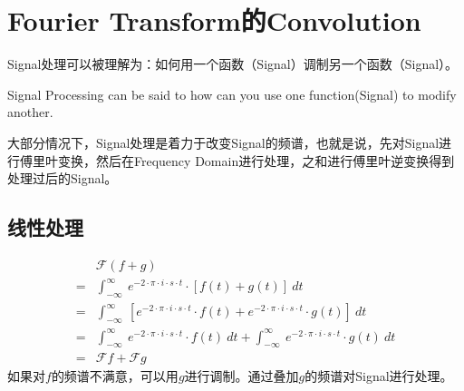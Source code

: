 \section{Fourier Transform的Convolution}
Signal处理可以被理解为：如何用一个函数（Signal）调制另一个函数（Signal）。

Signal Processing can be said to how can you use one function(Signal) to modify another.

大部分情况下，Signal处理是着力于改变Signal的频谱，也就是说，先对Signal进行傅里叶变换，然后在Frequency Domain进行处理，之和进行傅里叶逆变换得到处理过后的Signal。
\subsection{线性处理}
\begin{align*}
	  & \mathcal{F}(f+g)                                                                                                                                        \\
	= & \int_{-\infty}^{\infty}\ e^{-2\cdot \pi\cdot i\cdot s\cdot t}\cdot [f(t)+g(t)]\ dt                                                                      \\
	= & \int_{-\infty}^{\infty}\ [e^{-2\cdot \pi\cdot i\cdot s\cdot t}\cdot f(t)+e^{-2\cdot \pi\cdot i\cdot s\cdot t}\cdot g(t)]\ dt                            \\
	= & \int_{-\infty}^{\infty}\ e^{-2\cdot \pi\cdot i\cdot s\cdot t}\cdot f(t)\ dt+\int_{-\infty}^{\infty}\ e^{-2\cdot \pi\cdot i\cdot s\cdot t}\cdot g(t)\ dt \\
	= & \mathcal{F}f+\mathcal{F}g
\end{align*}
如果对$f$的频谱不满意，可以用$g$进行调制。通过叠加$g$的频谱对Signal进行处理。
